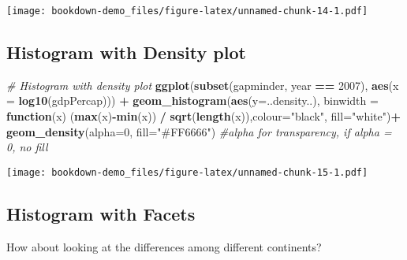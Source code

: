 \documentclass[
]{book}
\newenvironment{Shaded}{\begin{snugshade}}{\end{snugshade}}
\newcommand{\CommentTok}[1]{\textcolor[rgb]{0.56,0.35,0.01}{\textit{#1}}}
\newcommand{\ControlFlowTok}[1]{\textcolor[rgb]{0.13,0.29,0.53}{\textbf{#1}}}
\newcommand{\DataTypeTok}[1]{\textcolor[rgb]{0.13,0.29,0.53}{#1}}
\newcommand{\DecValTok}[1]{\textcolor[rgb]{0.00,0.00,0.81}{#1}}
\newcommand{\KeywordTok}[1]{\textcolor[rgb]{0.13,0.29,0.53}{\textbf{#1}}}
\newcommand{\NormalTok}[1]{#1}
\newcommand{\OperatorTok}[1]{\textcolor[rgb]{0.81,0.36,0.00}{\textbf{#1}}}
\newcommand{\StringTok}[1]{\textcolor[rgb]{0.31,0.60,0.02}{#1}}
\begin{document}
\texttt{[image: bookdown-demo\_files/figure-latex/unnamed-chunk-14-1.pdf]}

\pagebreak

\hypertarget{histogram-with-density-plot}{%
\subsection{Histogram with Density plot}\label{histogram-with-density-plot}}

\begin{Shaded}
\begin{Highlighting}[]
\CommentTok{# Histogram with density plot}
\KeywordTok{ggplot}\NormalTok{(}\KeywordTok{subset}\NormalTok{(gapminder, year }\OperatorTok{==}\StringTok{ }\DecValTok{2007}\NormalTok{),}
                \KeywordTok{aes}\NormalTok{(}\DataTypeTok{x =} \KeywordTok{log10}\NormalTok{(gdpPercap))) }\OperatorTok{+}\StringTok{  }
\StringTok{  }\KeywordTok{geom_histogram}\NormalTok{(}\KeywordTok{aes}\NormalTok{(}\DataTypeTok{y=}\NormalTok{..density..), }\DataTypeTok{binwidth =} \ControlFlowTok{function}\NormalTok{(x) (}\KeywordTok{max}\NormalTok{(x)}\OperatorTok{-}\KeywordTok{min}\NormalTok{(x)) }\OperatorTok{/}\StringTok{ }\KeywordTok{sqrt}\NormalTok{(}\KeywordTok{length}\NormalTok{(x)),}\DataTypeTok{colour=}\StringTok{"black"}\NormalTok{, }\DataTypeTok{fill=}\StringTok{"white"}\NormalTok{)}\OperatorTok{+}
\StringTok{  }\KeywordTok{geom_density}\NormalTok{(}\DataTypeTok{alpha=}\DecValTok{0}\NormalTok{, }\DataTypeTok{fill=}\StringTok{"#FF6666"}\NormalTok{) }\CommentTok{#alpha for transparency, if alpha = 0, no fill}
\end{Highlighting}
\end{Shaded}

\texttt{[image: bookdown-demo\_files/figure-latex/unnamed-chunk-15-1.pdf]}

\pagebreak

\hypertarget{histogram-with-facets}{%
\subsection{Histogram with Facets}\label{histogram-with-facets}}

How about looking at the differences among different continents?
\end{document}
